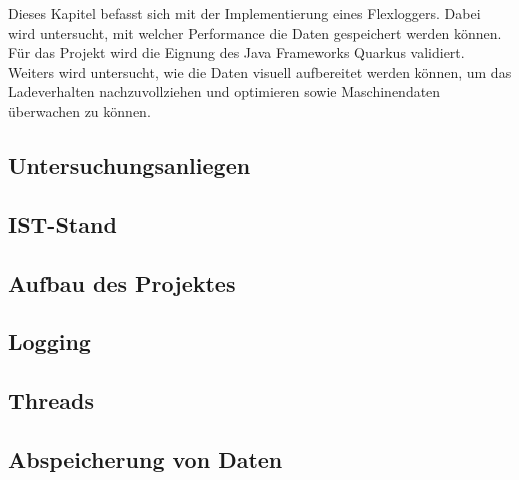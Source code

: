 Dieses Kapitel befasst sich mit der Implementierung eines Flexloggers. Dabei wird untersucht, mit welcher Performance die Daten gespeichert werden können. Für das Projekt wird die Eignung des Java Frameworks Quarkus validiert. Weiters wird untersucht, wie die Daten visuell aufbereitet werden können, um das Ladeverhalten nachzuvollziehen und optimieren sowie Maschinendaten überwachen zu können.

\begin{spacing}{1}
    \section{Untersuchungsanliegen}\label{section:untersuchungsanliegenFlexlogger}
    \end{spacing}


\begin{spacing}{1}
    \section{IST-Stand}\label{section:ist-standFlexlogger}
    \end{spacing}


\begin{spacing}{1}
    \section{Aufbau des Projektes}\label{section:aufbaudesProjektesFlexlogger}
    \end{spacing}


\begin{spacing}{1}
    \section{Logging}\label{section:logging}
    \end{spacing}


\begin{spacing}{1}
    \section{Threads}\label{section:threads}
    \end{spacing}


%

\begin{spacing}{1}
    \section{Abspeicherung von Daten}\label{section:savedata}
    \end{spacing}

